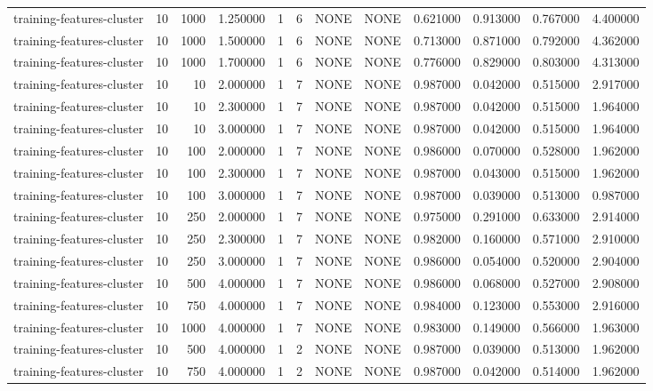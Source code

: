 \begin{tabular}{lrrrllllrrrr}
training-features-cluster & 10 & 1000 & 1.250000 & 1 & 6 & NONE & NONE & 0.621000 & 0.913000 & 0.767000 & 4.400000 \\
training-features-cluster & 10 & 1000 & 1.500000 & 1 & 6 & NONE & NONE & 0.713000 & 0.871000 & 0.792000 & 4.362000 \\
training-features-cluster & 10 & 1000 & 1.700000 & 1 & 6 & NONE & NONE & 0.776000 & 0.829000 & 0.803000 & 4.313000 \\
training-features-cluster & 10 & 10 & 2.000000 & 1 & 7 & NONE & NONE & 0.987000 & 0.042000 & 0.515000 & 2.917000 \\
training-features-cluster & 10 & 10 & 2.300000 & 1 & 7 & NONE & NONE & 0.987000 & 0.042000 & 0.515000 & 1.964000 \\
training-features-cluster & 10 & 10 & 3.000000 & 1 & 7 & NONE & NONE & 0.987000 & 0.042000 & 0.515000 & 1.964000 \\
training-features-cluster & 10 & 100 & 2.000000 & 1 & 7 & NONE & NONE & 0.986000 & 0.070000 & 0.528000 & 1.962000 \\
training-features-cluster & 10 & 100 & 2.300000 & 1 & 7 & NONE & NONE & 0.987000 & 0.043000 & 0.515000 & 1.962000 \\
training-features-cluster & 10 & 100 & 3.000000 & 1 & 7 & NONE & NONE & 0.987000 & 0.039000 & 0.513000 & 0.987000 \\
training-features-cluster & 10 & 250 & 2.000000 & 1 & 7 & NONE & NONE & 0.975000 & 0.291000 & 0.633000 & 2.914000 \\
training-features-cluster & 10 & 250 & 2.300000 & 1 & 7 & NONE & NONE & 0.982000 & 0.160000 & 0.571000 & 2.910000 \\
training-features-cluster & 10 & 250 & 3.000000 & 1 & 7 & NONE & NONE & 0.986000 & 0.054000 & 0.520000 & 2.904000 \\
training-features-cluster & 10 & 500 & 4.000000 & 1 & 7 & NONE & NONE & 0.986000 & 0.068000 & 0.527000 & 2.908000 \\
training-features-cluster & 10 & 750 & 4.000000 & 1 & 7 & NONE & NONE & 0.984000 & 0.123000 & 0.553000 & 2.916000 \\
training-features-cluster & 10 & 1000 & 4.000000 & 1 & 7 & NONE & NONE & 0.983000 & 0.149000 & 0.566000 & 1.963000 \\
training-features-cluster & 10 & 500 & 4.000000 & 1 & 2 & NONE & NONE & 0.987000 & 0.039000 & 0.513000 & 1.962000 \\
training-features-cluster & 10 & 750 & 4.000000 & 1 & 2 & NONE & NONE & 0.987000 & 0.042000 & 0.514000 & 1.962000 \\

\end{tabular}
